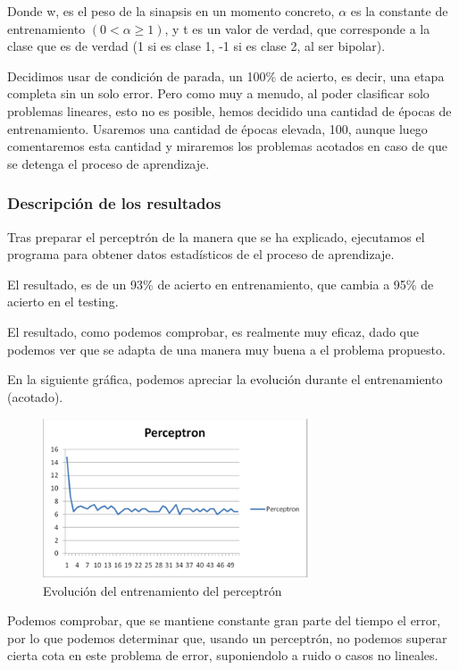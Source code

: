 \documentclass[12pt]{article}
\begin{document}
Donde w, es el peso de la sinapsis en un momento concreto, $\alpha$ es la constante de entrenamiento $(0 < \alpha \ge 1)$, y t es un valor de verdad, que corresponde a la clase que es de verdad (1 si es clase 1, -1 si es clase 2, al ser bipolar).

Decidimos usar de condición de parada, un 100\% de acierto, es decir, una etapa completa sin un solo error. Pero como muy a menudo, al poder clasificar solo problemas lineares, esto no es posible, hemos decidido una cantidad de épocas de entrenamiento. Usaremos una cantidad de épocas elevada, 100, aunque luego comentaremos esta cantidad y miraremos los problemas acotados en caso de que se detenga el proceso de aprendizaje.

\subsubsection{Descripción de los resultados}
Tras preparar el perceptrón de la manera que se ha explicado, ejecutamos el programa para obtener datos estadísticos de el proceso de aprendizaje.

El resultado, es de un 93\% de acierto en entrenamiento, que cambia a 95\% de acierto en el testing.

El resultado, como podemos comprobar, es realmente muy eficaz, dado que podemos ver que se adapta de una manera muy buena a el problema propuesto.

En la siguiente gráfica, podemos apreciar la evolución durante el entrenamiento (acotado).

\begin{figure}[h!]
    \label{fig:fig2}
  \centering
       \includegraphics[width=0.7\textwidth]{recursos/fig2}
    \caption{Evolución del entrenamiento del perceptrón}
\end{figure} 

Podemos comprobar, que se mantiene constante gran parte del tiempo el error, por lo que podemos determinar que, usando un perceptrón, no podemos superar cierta cota en este problema de error, suponiendolo a ruido o casos no lineales.
\end{document}

